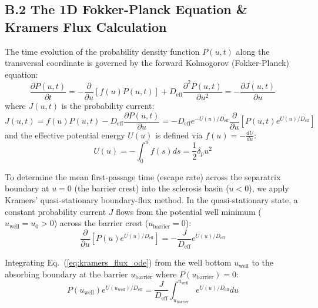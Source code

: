 \documentclass[preprint,12pt,authoryear]{elsarticle}
\theoremstyle{definition}
\begin{document}
\subsection*{B.2 The 1D Fokker-Planck Equation \& Kramers Flux Calculation}

The time evolution of the probability density function $P(u, t)$ along the transversal coordinate is governed by the forward Kolmogorov (Fokker-Planck) equation:
\begin{equation}
\frac{\partial P(u, t)}{\partial t} = -\frac{\partial}{\partial u} \left[ f(u) P(u, t) \right] + D_{\text{eff}} \frac{\partial^2 P(u, t)}{\partial u^2} = -\frac{\partial J(u, t)}{\partial u} \label{eq:fokker_planck}
\end{equation}
where $J(u, t)$ is the probability current:
\begin{equation}
J(u, t) = f(u) P(u, t) - D_{\text{eff}} \frac{\partial P(u, t)}{\partial u} = -D_{\text{eff}} e^{-U(u)/D_{\text{eff}}} \frac{\partial}{\partial u} \left[ P(u, t) e^{U(u)/D_{\text{eff}}} \right] \label{eq:prob_current}
\end{equation}
and the effective potential energy $U(u)$ is defined via $f(u) = -\frac{dU}{du}$:
\begin{equation}
U(u) = -\int_0^u f(s) ds = \frac{1}{2} \delta_p u^2 \label{eq:potential_u}
\end{equation}

To determine the mean first-passage time (escape rate) across the separatrix boundary at $u = 0$ (the barrier crest) into the sclerosis basin ($u < 0$), we apply Kramers' quasi-stationary boundary-flux method. In the quasi-stationary state, a constant probability current $J$ flows from the potential well minimum ($u_{\text{well}} = u_0 > 0$) across the barrier crest ($u_{\text{barrier}} = 0$):
\begin{equation}
\frac{\partial}{\partial u} \left[ P(u) e^{U(u)/D_{\text{eff}}} \right] = -\frac{J}{D_{\text{eff}}} e^{U(u)/D_{\text{eff}}} \label{eq:kramers_flux_ode}
\end{equation}

Integrating Eq.~(\ref{eq:kramers_flux_ode}) from the well bottom $u_{\text{well}}$ to the absorbing boundary at the barrier $u_{\text{barrier}}$ where $P(u_{\text{barrier}}) = 0$:
\begin{equation}
P(u_{\text{well}}) e^{U(u_{\text{well}})/D_{\text{eff}}} = \frac{J}{D_{\text{eff}}} \int_{u_{\text{barrier}}}^{u_{\text{well}}} e^{U(u)/D_{\text{eff}}} du \label{eq:kramers_integral}
\end{equation}
\end{document}
